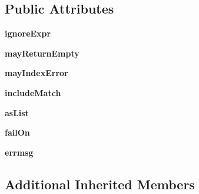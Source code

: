 \subsection*{Public Attributes}
\begin{DoxyCompactItemize}
\item 
\mbox{\label{classsetuptools_1_1__vendor_1_1pyparsing_1_1_skip_to_af12f21cafc85f05ad1941e2e220e1d6a}} 
{\bfseries ignore\+Expr}
\item 
\mbox{\label{classsetuptools_1_1__vendor_1_1pyparsing_1_1_skip_to_ace09988b780f04c038a1a34a493a6108}} 
{\bfseries may\+Return\+Empty}
\item 
\mbox{\label{classsetuptools_1_1__vendor_1_1pyparsing_1_1_skip_to_a1890c7dc658056ba0f28cd319d6aa9ad}} 
{\bfseries may\+Index\+Error}
\item 
\mbox{\label{classsetuptools_1_1__vendor_1_1pyparsing_1_1_skip_to_ade26777e0ed226ced1c5e3714a2562d4}} 
{\bfseries include\+Match}
\item 
\mbox{\label{classsetuptools_1_1__vendor_1_1pyparsing_1_1_skip_to_a99bcc295ebd114a5bacfbe737ba98968}} 
{\bfseries as\+List}
\item 
\mbox{\label{classsetuptools_1_1__vendor_1_1pyparsing_1_1_skip_to_ad631b250725091b5692bbad18f5bc237}} 
{\bfseries fail\+On}
\item 
\mbox{\label{classsetuptools_1_1__vendor_1_1pyparsing_1_1_skip_to_aef2fafd0e069050ccbe01b7070791245}} 
{\bfseries errmsg}
\end{DoxyCompactItemize}
\subsection*{Additional Inherited Members}


